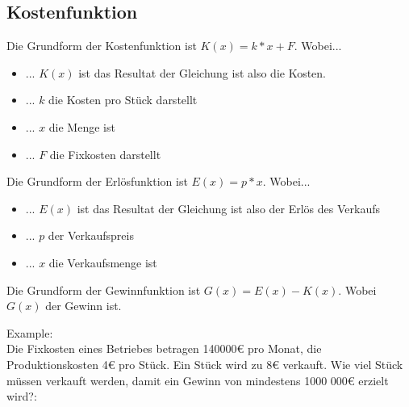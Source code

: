 \newpage
\subsection{Kostenfunktion}

Die Grundform der Kostenfunktion ist $K(x)=k*x+F$.
Wobei...
\begin{itemize}
    \item ... $K(x)$ ist das Resultat der Gleichung ist also die Kosten.
    \item ... $k$ die Kosten pro Stück darstellt
    \item ... $x$ die Menge ist
    \item ... $F$ die Fixkosten darstellt
\end{itemize}

\hfill \break
Die Grundform der Erlösfunktion ist $E(x)=p*x$.
Wobei...
\begin{itemize}
    \item ... $E(x)$ ist das Resultat der Gleichung ist also der Erlös des Verkaufs
    \item ... $p$ der Verkaufspreis
    \item ... $x$ die Verkaufsmenge ist
\end{itemize}

\hfill \break
Die Grundform der Gewinnfunktion ist $G(x)=E(x)-K(x)$.
Wobei $G(x)$ der Gewinn ist.

\hfill \break
Example:\\
Die Fixkosten eines Betriebes betragen 140000€ pro Monat, die Produktionskosten 4€ pro Stück. Ein Stück wird zu 8€
verkauft.
Wie viel Stück müssen verkauft werden, damit ein Gewinn von mindestens 1000 000€ erzielt wird?:\\
\fboxrule=0.8pt 